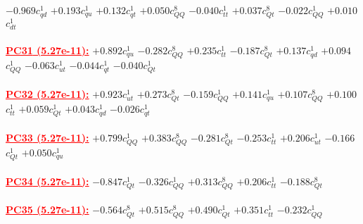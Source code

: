\documentclass{article}
\begin{document}
{$-0.969$}{\rm $c_{qd}^{1}$} 
{$+0.193$}{\rm $c_{qu}^{1}$} 
{$+0.132$}{\rm $c_{qt}^{1}$} 
{$+0.050$}{\rm $c_{QQ}^{8}$} 
{$-0.040$}{\rm $c_{tt}^{1}$} 
{$+0.037$}{\rm $c_{Qt}^{8}$} 
{$-0.022$}{\rm $c_{QQ}^{1}$} 
{$+0.010$}{\rm $c_{dt}^{1}$} 
 \nonumber \\ \nonumber \\ 
\noindent \textcolor{red}{\underline{\bf{PC31} (5.27e-11):}}
{$+0.892$}{\rm $c_{qu}^{1}$} 
{$-0.282$}{\rm $c_{QQ}^{8}$} 
{$+0.235$}{\rm $c_{tt}^{1}$} 
{$-0.187$}{\rm $c_{Qt}^{8}$} 
{$+0.137$}{\rm $c_{qd}^{1}$} 
{$+0.094$}{\rm $c_{QQ}^{1}$} 
{$-0.063$}{\rm $c_{ut}^{1}$} 
{$-0.044$}{\rm $c_{qt}^{1}$} 
{$-0.040$}{\rm $c_{Qt}^{1}$} 
 \nonumber \\ \nonumber \\ 
\noindent \textcolor{red}{\underline{\bf{PC32} (5.27e-11):}}
{$+0.923$}{\rm $c_{ut}^{1}$} 
{$+0.273$}{\rm $c_{Qt}^{8}$} 
{$-0.159$}{\rm $c_{QQ}^{1}$} 
{$+0.141$}{\rm $c_{qu}^{1}$} 
{$+0.107$}{\rm $c_{QQ}^{8}$} 
{$+0.100$}{\rm $c_{tt}^{1}$} 
{$+0.059$}{\rm $c_{Qt}^{1}$} 
{$+0.043$}{\rm $c_{qd}^{1}$} 
{$-0.026$}{\rm $c_{qt}^{1}$} 
 \nonumber \\ \nonumber \\ 
\noindent \textcolor{red}{\underline{\bf{PC33} (5.27e-11):}}
{$+0.799$}{\rm $c_{QQ}^{1}$} 
{$+0.383$}{\rm $c_{QQ}^{8}$} 
{$-0.281$}{\rm $c_{Qt}^{8}$} 
{$-0.253$}{\rm $c_{tt}^{1}$} 
{$+0.206$}{\rm $c_{ut}^{1}$} 
{$-0.166$}{\rm $c_{Qt}^{1}$} 
{$+0.050$}{\rm $c_{qu}^{1}$} 
 \nonumber \\ \nonumber \\ 
\noindent \textcolor{red}{\underline{\bf{PC34} (5.27e-11):}}
{$-0.847$}{\rm $c_{Qt}^{1}$} 
{$-0.326$}{\rm $c_{QQ}^{1}$} 
{$+0.313$}{\rm $c_{QQ}^{8}$} 
{$+0.206$}{\rm $c_{tt}^{1}$} 
{$-0.188$}{\rm $c_{Qt}^{8}$} 
 \nonumber \\ \nonumber \\ 
\noindent \textcolor{red}{\underline{\bf{PC35} (5.27e-11):}}
{$-0.564$}{\rm $c_{Qt}^{8}$} 
{$+0.515$}{\rm $c_{QQ}^{8}$} 
{$+0.490$}{\rm $c_{Qt}^{1}$} 
{$+0.351$}{\rm $c_{tt}^{1}$} 
{$-0.232$}{\rm $c_{QQ}^{1}$} 
 \nonumber \\ \nonumber \\ 
\end{document}
